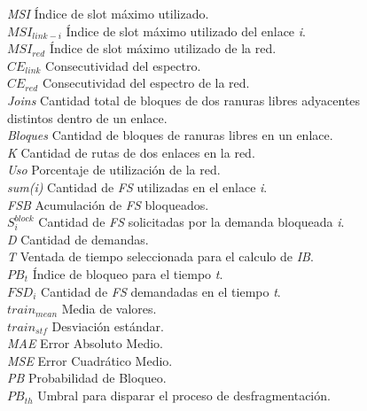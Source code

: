 \begin{tabbing}
\textit{MSI} \>\>\> Índice de slot máximo utilizado.\\
\textit{\(MSI_{link-i}\)} \>\>\> Índice de slot máximo utilizado del enlace \textit{i}. \\
\textit{\(MSI_{red}\)} \>\>\> Índice de slot máximo utilizado de la red. \\

\textit{\(CE_{link}\)} \>\>\> Consecutividad del espectro.\\
\textit{\(CE_{red}\)} \>\>\> Consecutividad del espectro de la red. \\
\textit{Joins} \>\>\> Cantidad total de bloques de dos ranuras libres adyacentes\\ 
                \>\>\>  distintos dentro de un enlace.\\
\textit{Bloques} \>\>\> Cantidad de bloques de ranuras libres en un enlace. \\
\textit{K} \>\>\> Cantidad de rutas de dos enlaces en la red.\\

\textit{Uso} \>\>\> Porcentaje de utilización de la red.\\
\textit{sum(i)} \>\>\> Cantidad de \textit{FS} utilizadas en el enlace \textit{i}.\\

\textit{FSB} \>\>\> Acumulación de \textit{FS} bloqueados.\\
\textit{\(S_{i}^{block}\)} \>\>\> Cantidad de \textit{FS} solicitadas por la demanda bloqueada \textit{i}.\\
\textit{D} \>\>\> Cantidad de demandas.\\
\textit{T} \>\>\> Ventada de tiempo seleccionada para el calculo de \textit{IB}.\\

\textit{\(PB_{t}\)} \>\>\> Índice de bloqueo para el tiempo \textit{t}.\\
\textit{\(FSD_{i}\)} \>\>\> Cantidad de \textit{FS} demandadas en el tiempo \textit{t}.\\ 

\textit{\(train_{mean}\)} \>\>\> Media de valores.\\
\textit{\(train_{stf}\)} \>\>\> Desviación estándar.\\

\textit{MAE} \>\>\> Error Absoluto Medio.\\
\textit{MSE} \>\>\> Error Cuadrático Medio.\\

\textit{PB} \>\>\> Probabilidad de Bloqueo.\\
\textit{\(PB_{th}\)} \>\>\> Umbral para disparar el proceso de desfragmentación.\\


\end{tabbing}
